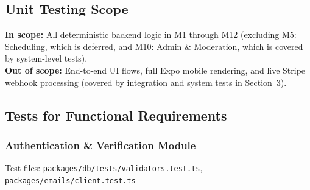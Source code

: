 \documentclass[12pt, titlepage]{article}
\begin{document}
\subsection{Unit Testing Scope}

\textbf{In scope:} All deterministic backend logic in M1 through M12 (excluding M5: Scheduling, which is deferred, and M10: Admin \& Moderation, which is covered by system-level tests).\\
\textbf{Out of scope:} End-to-end UI flows, full Expo mobile rendering, and live Stripe webhook processing (covered by integration and system tests in Section~3).

\subsection{Tests for Functional Requirements}

\subsubsection{Authentication \& Verification Module}

Test files: \texttt{packages/db/tests/validators.test.ts}, \texttt{packages/emails/client.test.ts}
\end{document}
